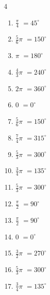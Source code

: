 \begin{multicols}{4}
\begin{enumerate}
  \item $\displaystyle \frac{\pi}{4}$
        $\displaystyle =45^{\circ}$

  \item $\displaystyle \frac{5}{6}\pi$
        $\displaystyle =150^{\circ}$

\columnbreak %

  \item $\displaystyle \pi$
        $\displaystyle =180^{\circ}$

  \item $\displaystyle \frac{4}{3}\pi$
        $\displaystyle =240^{\circ}$

  \item $\displaystyle 2\pi$
        $\displaystyle =360^{\circ}$

  \item $\displaystyle 0$
        $\displaystyle =0^{\circ}$

  \item $\displaystyle \frac{5}{6}\pi$
        $\displaystyle =150^{\circ}$

  \item $\displaystyle \frac{7}{4}\pi$
        $\displaystyle =315^{\circ}$

  \item $\displaystyle \frac{5}{3}\pi$
        $\displaystyle =300^{\circ}$

  \item $\displaystyle \frac{3}{4}\pi$
        $\displaystyle =135^{\circ}$

  \item $\displaystyle \frac{5}{3}\pi$
        $\displaystyle =300^{\circ}$

  \item $\displaystyle \frac{\pi}{2}$
        $\displaystyle =90^{\circ}$

  \item $\displaystyle \frac{\pi}{2}$
        $\displaystyle =90^{\circ}$

  \item $\displaystyle 0$
        $\displaystyle =0^{\circ}$

  \item $\displaystyle \frac{3}{2}\pi$
        $\displaystyle =270^{\circ}$

  \item $\displaystyle \frac{5}{3}\pi$
        $\displaystyle =300^{\circ}$

  \item $\displaystyle \frac{3}{4}\pi$
        $\displaystyle =135^{\circ}$


\end{enumerate}
\end{multicols}
